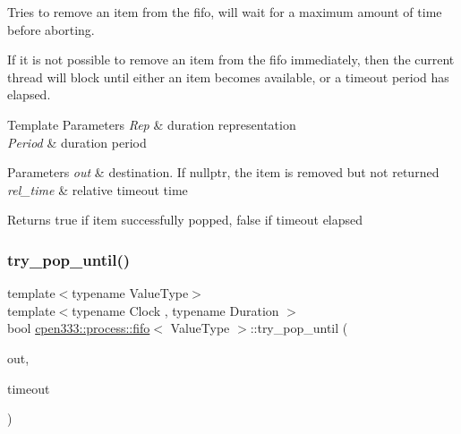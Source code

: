 Tries to remove an item from the fifo, will wait for a maximum amount of time before aborting. 

If it is not possible to remove an item from the fifo immediately, then the current thread will block until either an item becomes available, or a timeout period has elapsed.


\begin{DoxyTemplParams}{Template Parameters}
{\em Rep} & duration representation \\
\hline
{\em Period} & duration period \\
\hline
\end{DoxyTemplParams}

\begin{DoxyParams}{Parameters}
{\em out} & destination. If {\ttfamily nullptr}, the item is removed but not returned \\
\hline
{\em rel\+\_\+time} & relative timeout time \\
\hline
\end{DoxyParams}
\begin{DoxyReturn}{Returns}
{\ttfamily true} if item successfully popped, {\ttfamily false} if timeout elapsed 
\end{DoxyReturn}
\mbox{\label{classcpen333_1_1process_1_1fifo_a7e66a7f6e91c0725ad6a5f3940668e64}} 
\subsubsection{\texorpdfstring{try\+\_\+pop\+\_\+until()}{try\_pop\_until()}}
{\footnotesize\ttfamily template$<$typename Value\+Type$>$ \\
template$<$typename Clock , typename Duration $>$ \\
bool \hyperlink{classcpen333_1_1process_1_1fifo}{cpen333\+::process\+::fifo}$<$ Value\+Type $>$\+::try\+\_\+pop\+\_\+until (\begin{DoxyParamCaption}\item[{Value\+Type $\ast$}]{out,  }\item[{const std\+::chrono\+::time\+\_\+point$<$ Clock, Duration $>$ \&}]{timeout }\end{DoxyParamCaption})\hspace{0.3cm}{\ttfamily [inline]}}



